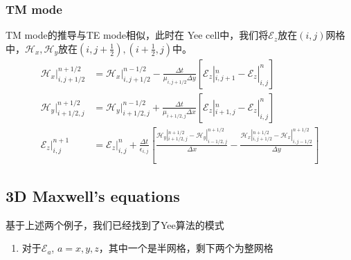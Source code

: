 \documentclass{article}
\newcommand{\nobracket}{}
\begin{document}
\begin{CJK*}{UTF8}{gbsn}
\subsubsection{TM mode}

TM mode的推导与TE mode相似，此时在 Yee
cell中，我们将$\mathscr{E}_z$放在$(i, j)$网格中，$\mathscr{H}_x,
\mathscr{H}_y$放在$\left( i, j + \frac{1}{2} \right), \left( i +
\frac{1}{2}, j \right)$中。
\[ \begin{aligned}
     \nobracket \mathscr{H}_x |_{i, j + 1 / 2}^{n + 1 / 2} & = \nobracket
     \mathscr{H}_x |_{i, j + 1 / 2}^{n - 1 / 2} - \frac{\Delta t}{\mu_{i, j +
     1 / 2} \Delta y}  [\nobracket \mathscr{E}_z |_{i, j + 1}^n - \nobracket
     \mathscr{E}_z |_{i, j}^n]\\
     \nobracket \mathscr{H}_y |_{i + 1 / 2, j}^{n + 1 / 2} & = \nobracket
     \mathscr{H}_y |_{i + 1 / 2, j}^{n - 1 / 2} + \frac{\Delta t}{\mu_{i + 1 /
     2, j} \Delta x}  [\nobracket \mathscr{E}_z |_{i + 1, j}^n - \nobracket
     \mathscr{E}_z |_{i, j}^n]\\
     \nobracket \mathscr{E}_z |_{i, j}^{n + 1} & = \nobracket \mathscr{E}_z
     |_{i, j}^n + \frac{\Delta t}{\epsilon_{i, j}}  \left[ \frac{\nobracket
     \mathscr{H}_y |_{i + 1 / 2, j}^{n + 1 / 2} - \nobracket \mathscr{H}_y
     |_{i - 1 / 2, j}^{n + 1 / 2}}{\Delta x} - \frac{\nobracket \mathscr{H}_x
     |_{i, j + 1 / 2}^{n + 1 / 2} - \nobracket \mathscr{H}_x |_{i, j - 1 /
     2}^{n + 1 / 2}}{\Delta y} \right]
   \end{aligned} \]

\subsection{3D Maxwell's equations}

基于上述两个例子，我们已经找到了Yee算法的模式
\begin{enumerate}
  \item 对于$\mathscr{E}_a$, $a = x, y,
  z$，其中一个是半网格，剩下两个为整网格
  

\end{enumerate}
\end{CJK*}
\end{document}
